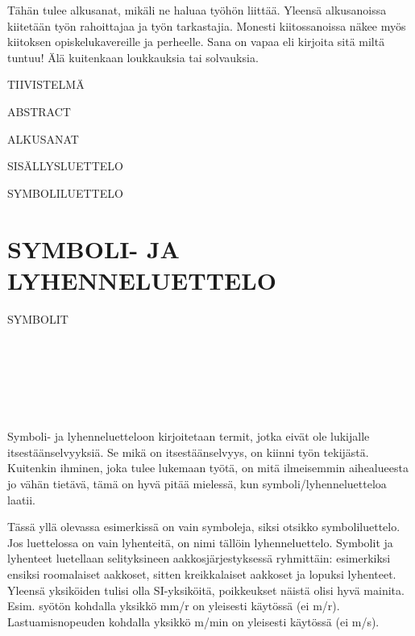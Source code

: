 \documentclass{LUT_pohja}[2016/03/09 LUT Dippa Pohja]
\begin{document}
\begin{preface}

Tähän tulee alkusanat, mikäli ne haluaa työhön liittää. Yleensä alkusanoissa kiitetään työn 
rahoittajaa  ja  työn tarkastajia.  Monesti kiitossanoissa  näkee  myös  kiitoksen 
opiskelukavereille ja perheelle. Sana on vapaa eli kirjoita sitä miltä tuntuu! Älä kuitenkaan 
loukkauksia tai solvauksia. 

\end{preface}

\renewcommand\refname{LÄHTEET}
\renewcommand\contentsname{ }

\pagestyle{Mainstyle}
\newpage
\begin{luettelo}
\MakeUppercase{Tiivistelmä}\par
\MakeUppercase{Abstract}\par
\MakeUppercase{Alkusanat}\par
\MakeUppercase{Sisällysluettelo}\par
\MakeUppercase{Symboliluettelo}\par
\end{luettelo}
\tableofcontents
\newpage
\section*{\MakeUppercase{Symboli- ja lyhenneluettelo}}
SYMBOLIT\par
\itab{$\alpha$} \\
 \\
 \\
 \\
 \\
 

Symboli-  ja  lyhenneluetteloon  kirjoitetaan  termit,  jotka  eivät  ole  lukijalle 
itsestäänselvyyksiä. Se mikä on itsestäänselvyys, on kiinni työn tekijästä. Kuitenkin 
ihminen, joka tulee lukemaan työtä, on mitä ilmeisemmin aihealueesta jo vähän tietävä, 
tämä on hyvä pitää mielessä, kun symboli/lyhenneluetteloa laatii.\par
Tässä yllä olevassa esimerkissä on vain symboleja, siksi otsikko symboliluettelo. Jos 
luettelossa on vain lyhenteitä, on nimi tällöin lyhenneluettelo. Symbolit  ja lyhenteet 
luetellaan selityksineen aakkosjärjestyksessä ryhmittäin: esimerkiksi ensiksi roomalaiset 
aakkoset, sitten kreikkalaiset aakkoset ja lopuksi lyhenteet. Yleensä yksiköiden tulisi olla 
SI-yksiköitä, poikkeukset näistä olisi hyvä mainita. Esim. syötön kohdalla yksikkö mm/r 
on yleisesti käytössä (ei m/r). Lastuamisnopeuden kohdalla yksikkö m/min on yleisesti 
käytössä (ei m/s).
\end{document}
